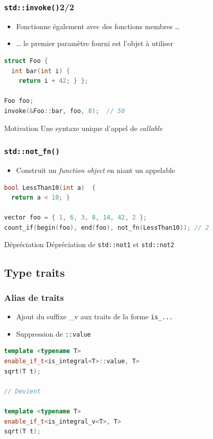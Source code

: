 \documentclass[C++.tex]{subfiles}
\begin{document}
\begin{frame}[fragile]
	\frametitle{\lstinline|std::invoke()|\titlehfill{}2/2}
	\begin{itemize}
		\item Fonctionne également avec des fonctions membres \ldots
		\item \ldots{} le premier paramètre fourni est l'objet à utiliser
	\end{itemize}

	\begin{lstlisting}[language=C++]
struct Foo {
  int bar(int i) {
    return i + 42; } };

Foo foo;
invoke(&Foo::bar, foo, 8);  // 50\end{lstlisting}

	\begin{block}{Motivation}
		Une syntaxe unique d'appel de \textit{callable}
	\end{block}
\end{frame}

\begin{frame}[fragile]
	\frametitle{\lstinline|std::not_fn()|}
	\begin{itemize}
		\item Construit un \textit{function object} en niant un appelable
	\end{itemize}

	\begin{lstlisting}[language=C++]
bool LessThan10(int a) 	{
  return a < 10; }
	
vector foo = { 1, 6, 3, 8, 14, 42, 2 };
count_if(begin(foo), end(foo), not_fn(LessThan10)); // 2\end{lstlisting}

	\begin{block}{Dépréciation}
		Dépréciation de \lstinline|std::not1| et \lstinline|std::not2|
	\end{block}
\end{frame}

\subsection*{Type traits}
\begin{frame}[fragile]
	\frametitle{Alias de traits}
	\begin{itemize}
		\item Ajout du suffixe \_v aux traits de la forme \lstinline|is_...|
		\item Suppression de \lstinline|::value|
	\end{itemize}

	\begin{lstlisting}[language=C++]
template <typename T>
enable_if_t<is_integral<T>::value, T>
sqrt(T t);

// Devient 

template <typename T>
enable_if_t<is_integral_v<T>, T>
sqrt(T t);\end{lstlisting}


\end{frame}
\end{document}
